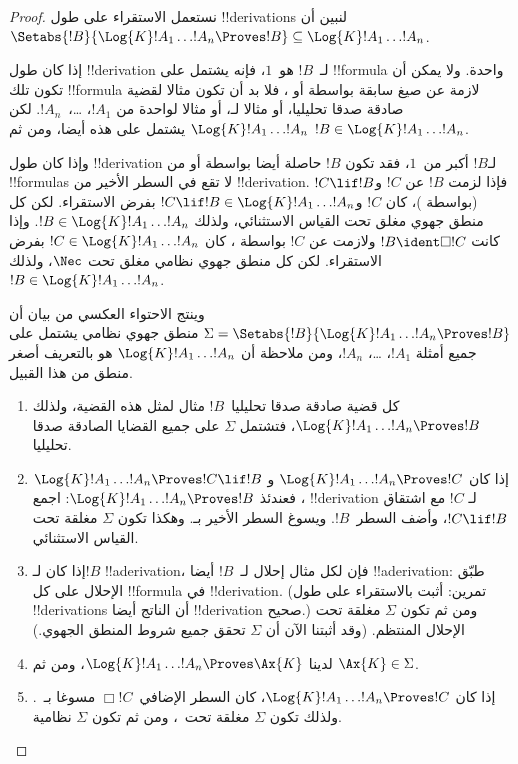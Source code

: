 \documentclass[../../../include/open-logic-section]{subfiles}
\begin{document}
\begin{proof}
  نستعمل الاستقراء على طول !!{derivation}s لنبين أن
  $\Setabs{!B}{\Log{K} !A_1 \dots !A_n \Proves !B} \subseteq
  \Log{K} !A_1 \dots !A_n$.

  إذا كان طول !!{derivation} لـ~$!B$ هو~$1$، فإنه يشتمل على
  !!{formula} واحدة. ولا يمكن أن تكون تلك !!{formula} لازمة عن صيغ
  سابقة بواسطة \MP{} أو \Nec، فلا بد أن تكون مثالا لقضية صادقة صدقا
  تحليليا، أو مثالا لـ، أو مثالا
  لواحدة من $!A_1$، \dots،~$!A_n$. لكن $\Log{K}!A_1\dots!A_n$ يشتمل
  على هذه أيضا، ومن ثم $!B \in \Log{K}!A_1 \dots !A_n$.

  وإذا كان طول !!{derivation} لـ$!B$ أكبر من~$1$، فقد تكون $!B$
  حاصلة أيضا بواسطة \MP{} أو \Nec{} من !!{formula}s لا تقع في السطر
  الأخير من !!{derivation}. فإذا لزمت $!B$ عن $!C$ و$!C \lif !B$
  (بواسطة \MP)، كان $!C$ و$!C \lif !B \in
  \Log{K}!A_1 \dots !A_n$ بفرض الاستقراء. لكن كل منطق جهوي مغلق تحت
  القياس الاستثنائي، ولذلك $!B \in \Log{K}!A_1 \dots !A_n$. وإذا
  كانت $!B \ident \Box !C$ ولازمت عن $!C$ بواسطة \Nec، كان $!C
  \in \Log{K}!A_1 \dots !A_n$ بفرض الاستقراء. لكن كل منطق جهوي
  نظامي مغلق تحت $\Nec$، ولذلك $!B \in
  \Log{K}!A_1\dots!A_n$.

  وينتج الاحتواء العكسي من بيان أن
  $\Sigma = \Setabs{!B}{\Log{K} !A_1 \dots !A_n \Proves !B }$ منطق جهوي
  نظامي يشتمل على جميع أمثلة $!A_1$، \dots، $!A_n$، ومن ملاحظة أن
  $\Log{K} !A_1 \dots !A_n$ هو بالتعريف أصغر منطق من هذا القبيل.
  \begin{enumerate}
    \item كل قضية صادقة صدقا تحليليا~$!B$ مثال لمثل هذه القضية، ولذلك
      $\Log{K}!A_1\dots!A_n \Proves !B$، فتشتمل $\Sigma$ على جميع
      القضايا الصادقة صدقا تحليليا.
    \item إذا كان $\Log{K}!A_1\dots!A_n \Proves !C$ و
      $\Log{K}!A_1\dots!A_n \Proves !C \lif !B$، فعندئذ
      $\Log{K}!A_1\dots!A_n \Proves !B$: اجمع !!{derivation} لـ
      $!C$ مع اشتقاق $!C \lif !B$، وأضف السطر~$!B$. ويسوغ السطر
      الأخير بـ\MP{}. وهكذا تكون $\Sigma$ مغلقة تحت القياس الاستثنائي.
    \item إذا كان لـ$!B$ !!a{derivation}، فإن لكل مثال إحلال لـ~$!B$
      أيضا !!a{derivation}: طبّق الإحلال على كل !!{formula} في
      !!{derivation}. (تمرين: أثبت بالاستقراء على طول !!{derivation}s
      أن الناتج أيضا !!{derivation} صحيح.) ومن ثم تكون $\Sigma$
      مغلقة تحت الإحلال المنتظم. (وقد أثبتنا الآن أن $\Sigma$ تحقق
      جميع شروط المنطق الجهوي.)
    \item لدينا $\Log{K}!A_1\dots!A_n \Proves \Ax{K}$، ومن ثم
      $\Ax{K} \in \Sigma$.
    \item إذا كان $\Log{K}!A_1\dots!A_n \Proves !C$، كان السطر
      الإضافي~$\Box !C$ مسوغا بـ~\Nec. ولذلك تكون $\Sigma$ مغلقة
      تحت~\Nec، ومن ثم تكون $\Sigma$ نظامية.
  \end{enumerate}
\end{proof}
\end{document}
